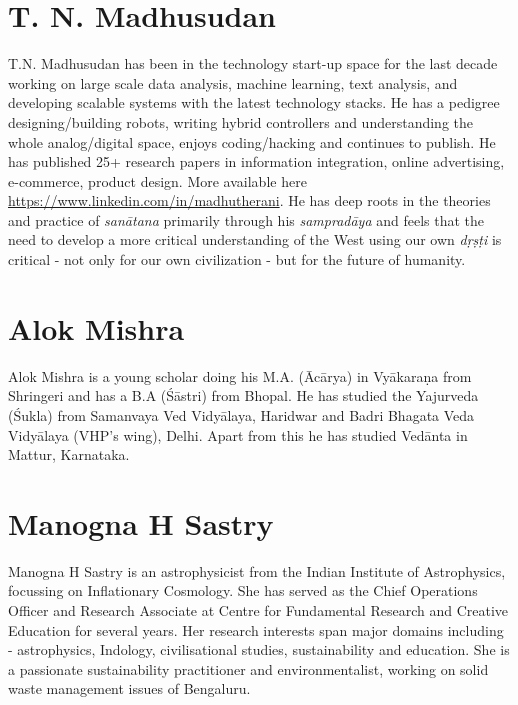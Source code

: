 \vspace{-.3cm}

\section*{T. N. Madhusudan}

T.N. Madhusudan has been in the technology start-up space for the last decade working on large scale data analysis, machine learning, text analysis, and developing scalable systems with the latest technology stacks. He has a pedigree designing/building robots, writing hybrid controllers and understanding the whole analog/digital space, enjoys coding/hacking and continues to publish. He has published 25+ research papers in information integration, online advertising, e-commerce, product design. More available here \url{https://www.linkedin.com/in/madhutherani}. He has deep roots in the theories and practice of \textit{sanātana} primarily through his \textit{sampradāya} and feels that the need to develop a more critical understanding of the West using our own \textit{dṛṣṭi} is critical - not only for our own civilization - but for the future of humanity.

\vspace{-.3cm}

\section*{Alok Mishra}

Alok Mishra is a young scholar doing his M.A. (Ācārya) in Vyākaraṇa from Shringeri and has a B.A (Śāstri) from Bhopal. He has studied the Yajurveda (Śukla) from Samanvaya Ved Vidyālaya, Haridwar and Badri Bhagata Veda Vidyālaya (VHP’s wing), Delhi. Apart from this he has studied Vedānta in Mattur, Karnataka.

\vspace{-.3cm}

\section*{Manogna H Sastry}

Manogna H Sastry is an astrophysicist from the Indian Institute of Astrophysics, focussing on Inflationary Cosmology. She has served as the Chief Operations Officer and Research Associate at Centre for Fundamental Research and Creative Education for several years. Her research interests span major domains including - astrophysics, Indology, civilisational studies, sustainability and education. She is a passionate sustainability practitioner and environmentalist, working on solid waste management issues of Bengaluru.

